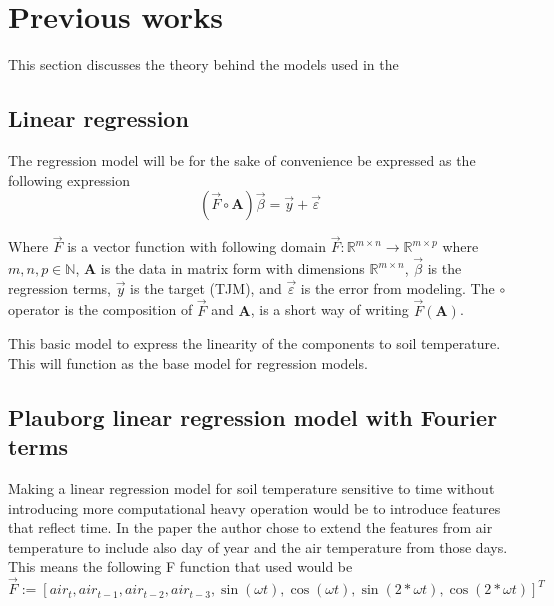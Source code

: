 \section{Previous works}\label{sec:theory}

This section discusses the theory behind the models used in the 

\subsection{Linear regression}\label{sec:theory:linreg}

The regression model will be for the sake of convenience be expressed as the following expression
$$
\left(\vec{F}\circ \mathbf{A}\right)\vec{\beta}=\vec{y}+\vec{\varepsilon}
$$

Where $\vec{F}$ is a vector function with following domain $\vec{F}:\mathbb{R}^{m\times n}\to \mathbb{R}^{m\times p}$ where $m,n,p\in \mathbb{N}$, $\mathbf{A}$ is the data in matrix form with dimensions $\mathbb{R}^{m\times n}$, $\vec{\beta}$ is the regression terms, $\vec{y}$ is the target (TJM), and $\vec{\varepsilon}$ is the error from modeling. The $\circ$ operator is the composition of $\vec{F}$ and $\mathbf{A}$, is a short way of writing $\vec{F}(\mathbf{A})$.

This basic model to express the linearity of the components to soil temperature. This will function as the base model for regression models. 

\subsection[Plauborg Regression]{Plauborg linear regression model with Fourier terms}\label{sec:theory:pluborg}

Making a linear regression model for soil temperature sensitive to time without introducing more computational heavy operation would be to introduce features that reflect time. In the paper  the author chose to extend the features from air temperature to include also day of year and the air temperature from those days. This means the following F function that \citeauthor{plauborg_simple_2002} used would be 
$$
\vec{F} := [air_t , air_{t-1}, air_{t-2}, air_{t-3}, \sin(\omega t) , \cos(\omega t), \sin(2*\omega t), \cos(2*\omega t)]^T
$$

